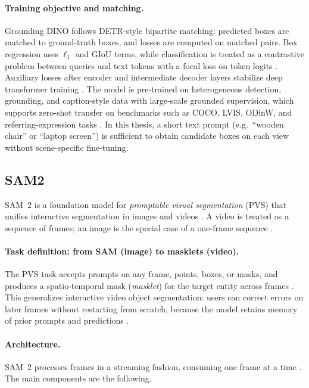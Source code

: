 \paragraph{Training objective and matching.}
Grounding DINO follows DETR-style bipartite matching: predicted boxes are matched to ground-truth boxes, and losses are computed on matched pairs. Box regression uses $\ell_1$ and GIoU terms, while classification is treated as a contrastive problem between queries and text tokens with a focal loss on token logits \cite{liu2023groundingdino}. Auxiliary losses after encoder and intermediate decoder layers stabilize deep transformer training \cite{liu2023groundingdino}. The model is pre-trained on heterogeneous detection, grounding, and caption-style data with large-scale grounded supervision, which supports zero-shot transfer on benchmarks such as COCO, LVIS, ODinW, and referring-expression tasks \cite{liu2023groundingdino}. In this thesis, a short text prompt (e.g.\ ``wooden chair'' or ``laptop screen'') is sufficient to obtain candidate boxes on each view without scene-specific fine-tuning.

\subsection{SAM2}
SAM~2 is a foundation model for \emph{promptable visual segmentation} (PVS) that unifies interactive segmentation in images and videos \cite{ravi2024sam2}. A video is treated as a sequence of frames; an image is the special case of a one-frame sequence \cite{ravi2024sam2}.

\paragraph{Task definition: from SAM (image) to masklets (video).}
The PVS task accepts prompts on any frame, points, boxes, or masks, and produces a spatio-temporal mask (\emph{masklet}) for the target entity across frames \cite{ravi2024sam2}. This generalizes interactive video object segmentation: users can correct errors on later frames without restarting from scratch, because the model retains memory of prior prompts and predictions \cite{ravi2024sam2}.


\paragraph{Architecture.}
SAM~2 processes frames in a streaming fashion, consuming one frame at a time \cite{ravi2024sam2}. The main components are the following.

